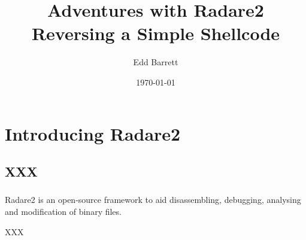 \documentclass{beamer}
\title{Adventures with Radare2\\Reversing a Simple Shellcode}
\author{Edd Barrett}
\date{\today}
\institute{%
  canthack.org
}
\begin{document}
\begin{frame}
  \titlepage
\end{frame}

\section{Introducing Radare2}



\subsection{XXX}
\begin{frame}[fragile]
\frametitle{\insertsubsection}

\begin{block}
Radare2 is an open-source framework to aid disassembling, debugging, analysing and
modification of binary files.
\end{block}


XXX

\end{frame}
\end{document}
